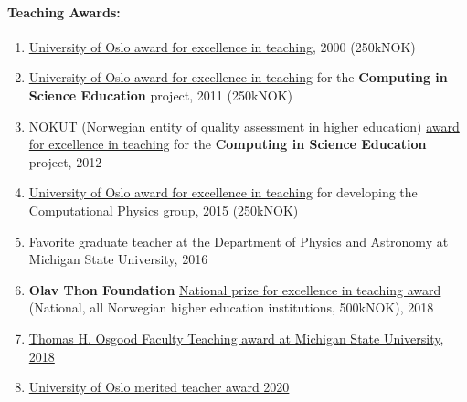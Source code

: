\documentclass[%
oneside,                 %
final,                   %
10pt]{article}
\begin{document}
\paragraph{Teaching Awards:}
\begin{enumerate}
\item \href{{http://www.uniforum.uio.no/nyheter/2000/11/det-viktigste-er-aa-inspirere.html}}{University of Oslo award for excellence in teaching}, 2000 (250kNOK)

\item \href{{http://www.uniforum.uio.no/nyheter/2011/08/undervisning-for-framtidig-forsking.html}}{University of Oslo award for excellence in teaching} for the \textbf{Computing in Science Education} project, 2011 (250kNOK)

\item NOKUT (Norwegian entity of quality assessment in higher education) \href{{http://www.uniforum.uio.no/nyheter/2012/04/uio-tok-andreplass-i-utdanningskvalitet.html}}{award for excellence in teaching} for the \textbf{Computing in Science Education} project, 2012

\item \href{{http://www.uniforum.uio.no/nyheter/2015/10/instituttet-som-lofter-fram-gode-forelesere.html}}{University of Oslo award for excellence in teaching} for developing the Computational Physics group, 2015 (250kNOK)

\item Favorite graduate teacher at the Department of Physics and Astronomy at Michigan State University, 2016 

\item \textbf{Olav Thon Foundation} \href{{https://www.ntbinfo.no/pressemelding/olav-thon-stiftelsen-annonserte-arets-priser-42-millioner-til-forskning-og-undervisning?publisherId=8983491&releaseId=16475069}}{National prize for excellence in teaching award} (National, all Norwegian higher education institutions, 500kNOK), 2018

\item \href{{https://web.pa.msu.edu/alumni/awards/osgood_fac_awards.html}}{Thomas H. Osgood Faculty Teaching award at Michigan State University, 2018}

\item \href{{https://titan.uio.no/utdanning/2020/to-fysikere-belonnes-for%
\end{enumerate}

\noindent
\end{document}
